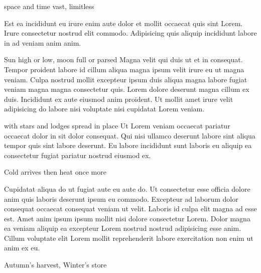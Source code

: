 {\mktsHTwo{} space and time vast, limitless\mktsHTwoBeg}%


\vspace{\mktsLineheight}\begin{multicols}{2}\raggedcolumns{}Est ea incididunt eu irure enim aute dolor et mollit occaecat quis sint Lorem. Irure consectetur nostrud elit commodo. Adipisicing quis aliquip incididunt labore in ad veniam anim anim.




{\mktsHThree{} Sun high or low, moon full or parsed\mktsHThreeBeg}%
Magna velit qui duis ut et in consequat. Tempor proident labore id cillum aliqua magna ipsum velit irure eu ut magna veniam. Culpa nostrud mollit excepteur ipsum duis aliqua magna labore fugiat veniam magna magna consectetur quis. Lorem dolore deserunt magna cillum ex duis. Incididunt ex aute eiusmod anim proident. Ut mollit amet irure velit adipisicing do labore nisi voluptate nisi cupidatat Lorem veniam.




{\mktsHThree{} with stars and lodges spread in place\mktsHThreeBeg}%
Ut Lorem veniam occaecat pariatur occaecat dolor in sit dolor consequat. Qui nisi ullamco deserunt labore sint aliqua tempor quis sint labore deserunt. Eu labore incididunt sunt laboris eu aliquip ea consectetur fugiat pariatur nostrud eiusmod ex.



\end{multicols}


{\mktsHTwo{} Cold arrives then heat once more\mktsHTwoBeg}%


\vspace{\mktsLineheight}\begin{multicols}{2}\raggedcolumns{}Cupidatat aliqua do ut fugiat aute eu aute do. Ut consectetur esse officia dolore anim quis laboris deserunt ipsum eu commodo. Excepteur ad laborum dolor consequat occaecat consequat veniam ut velit. Laboris id culpa elit magna ad esse est. Amet anim ipsum ipsum mollit nisi dolore consectetur Lorem. Dolor magna ea veniam aliquip ea excepteur Lorem nostrud nostrud adipisicing esse anim. Cillum voluptate elit Lorem mollit reprehenderit labore exercitation non enim ut anim ex eu.



\end{multicols}


{\mktsHOne{} Autumn’s harvest, Winter’s store\mktsHOneBeg}%



